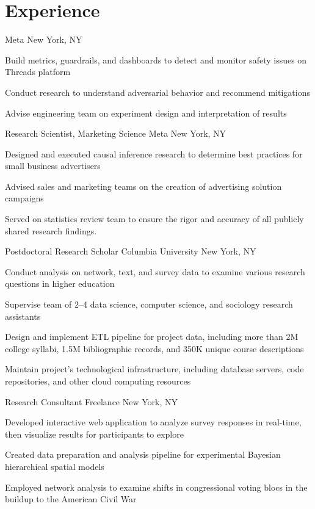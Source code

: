 
\section*{Experience}

  {}
  {Meta}
  {New York, NY}
  {}
  {
    \item Build metrics, guardrails, and dashboards to detect and monitor safety issues on Threads platform
    \item Conduct research to understand adversarial behavior and recommend mitigations
    \item Advise engineering team on experiment design and interpretation of results
  }


  {Research Scientist, Marketing Science}
  {Meta}
  {New York, NY}
  {}
  {
    \item Designed and executed causal inference research to determine best practices for small business advertisers
    \item Advised sales and marketing teams on the creation of advertising solution campaigns
    \item Served on statistics review team to ensure the rigor and accuracy of all publicly shared research findings.
  }

  {Postdoctoral Research Scholar}
  {Columbia University}
  {New York, NY}
  {}
  {
    \item Conduct analysis on network, text, and survey data to examine various research questions in higher education
    \item Supervise team of 2–4 data science, computer science, and sociology research assistants
    \item Design and implement ETL pipeline for project data, including more than 2M college syllabi, 1.5M bibliographic records, and 350K unique course descriptions
    \item Maintain project's technological infrastructure, including database servers, code repositories, and other cloud computing resources
  }

  {Research Consultant}
  {Freelance}
  {New York, NY}
  {}
  {
    \item Developed interactive web application to analyze survey responses in real-time, then visualize results for participants to explore
    \item Created data preparation and analysis pipeline for experimental Bayesian hierarchical spatial models
    \item Employed network analysis to examine shifts in congressional voting blocs in the buildup to the American Civil War
  }

